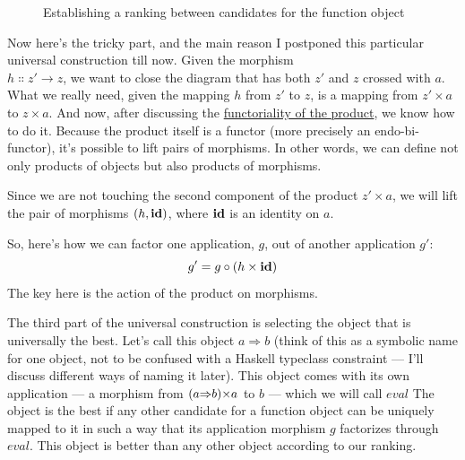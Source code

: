 \begin{figure}
\centering
{}
\caption{Establishing a ranking between candidates for the function object}
\end{figure}

Now here's the tricky part, and the main reason I postponed this
particular universal construction till now. Given the morphism\\
$h \Colon z'\to z$, we want to close the diagram
that has both $z'$ and $z$ crossed with $a$.
What we really need, given the mapping $h$ from $z'$
to $z$, is a mapping from $z'\times a$ to $z\times a$.
And now, after discussing the \hyperref[functoriality]{functoriality
of the product}, we know how to do it. Because the product itself is a
functor (more precisely an endo-bi-functor), it's possible to lift pairs
of morphisms. In other words, we can define not only products of objects
but also products of morphisms.

Since we are not touching the second component of the product
$z'\times a$, we will lift the pair of morphisms
$(h, \mathbf{id})$, where $\mathbf{id}$ is an identity on $a$.

So, here's how we can factor one application, $g$, out of another
application $g'$:
\[g' = g \circ (h \times \mathbf{id})\]
The key here is the action of the product on morphisms.

The third part of the universal construction is selecting the object
that is universally the best. Let's call this object $a{\Rightarrow} b$ (think
of this as a symbolic name for one object, not to be confused with a
Haskell typeclass constraint --- I'll discuss different ways of naming
it later). This object comes with its own application --- a morphism
from $(a{\Rightarrow}b){\times} a$ to $b$ --- which we will call
$eval$ The object  is the best if any other
candidate for a function object can be uniquely mapped to it in such a
way that its application morphism $g$ factorizes through
$eval$. This object is better than any other object according to
our ranking.

